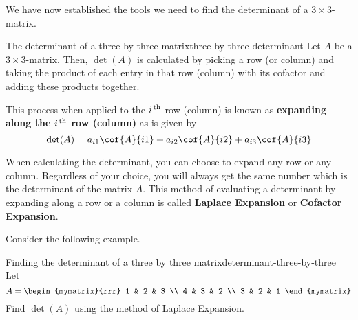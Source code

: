We have now established the tools we need to find the determinant of a
$3\times3$-matrix.

\begin{definition}{The determinant of a three by three matrix}{three-by-three-determinant}
  Let $A$ be a $3\times 3$-matrix. Then, $\det(A)$ is calculated by
  picking a row (or column) and taking the product of each entry in
  that row (column) with its cofactor and adding these products
  together.

  This process when applied to the $i^{\,\rm th}$ row (column) is known as
  \textbf{expanding along the $i^{\,\rm th}$ row (column)}%
   as is given by
  \[
    \det(A) =
    a_{i1}\cof{A}{i1} + a_{i2}\cof{A}{i2} + a_{i3}\cof{A}{i3}
  \]
\end{definition}

When calculating the determinant, you can choose to expand any row or
any column. Regardless of your choice, you will always get the same
number which is the determinant of the matrix $A$.  This method of
evaluating a determinant by expanding along a row or a column is
called \textbf{Laplace Expansion} or
\textbf{Cofactor Expansion}.

Consider the following example.

\begin{example}{Finding the determinant of a three by three matrix}{determinant-three-by-three}
  Let
  \begin{equation*}
    A=\begin{mymatrix}{rrr}
      1 & 2 & 3 \\
      4 & 3 & 2 \\
      3 & 2 & 1
    \end{mymatrix} 
  \end{equation*}
  Find $\det(A)$ using the method of Laplace Expansion.
\end{example}

